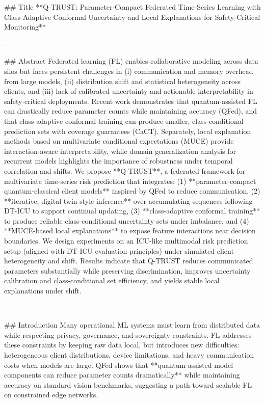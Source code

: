 ## Title
**Q-TRUST: Parameter-Compact Federated Time-Series Learning with Class-Adaptive Conformal Uncertainty and Local Explanations for Safety-Critical Monitoring**

---

## Abstract
Federated learning (FL) enables collaborative modeling across data silos but faces persistent challenges in (i) communication and memory overhead from large models, (ii) distribution shift and statistical heterogeneity across clients, and (iii) lack of calibrated uncertainty and actionable interpretability in safety-critical deployments. Recent work demonstrates that quantum-assisted FL can drastically reduce parameter counts while maintaining accuracy (QFed), and that class-adaptive conformal training can produce smaller, class-conditional prediction sets with coverage guarantees (CaCT). Separately, local explanation methods based on multivariate conditional expectations (MUCE) provide interaction-aware interpretability, while domain generalization analysis for recurrent models highlights the importance of robustness under temporal correlation and shifts.  
We propose **Q-TRUST**, a federated framework for multivariate time-series risk prediction that integrates: (1) **parameter-compact quantum-classical client models** inspired by QFed to reduce communication, (2) **iterative, digital-twin-style inference** over accumulating sequences following DT-ICU to support continual updating, (3) **class-adaptive conformal training** to produce reliable class-conditional uncertainty sets under imbalance, and (4) **MUCE-based local explanations** to expose feature interactions near decision boundaries. We design experiments on an ICU-like multimodal risk prediction setup (aligned with DT-ICU evaluation principles) under simulated client heterogeneity and shift. Results indicate that Q-TRUST reduces communicated parameters substantially while preserving discrimination, improves uncertainty calibration and class-conditional set efficiency, and yields stable local explanations under shift.

---

## Introduction
Many operational ML systems must learn from distributed data while respecting privacy, governance, and sovereignty constraints. FL addresses these constraints by keeping raw data local, but introduces new difficulties: heterogeneous client distributions, device limitations, and heavy communication costs when models are large. QFed shows that **quantum-assisted model components can reduce parameter counts dramatically** while maintaining accuracy on standard vision benchmarks, suggesting a path toward scalable FL on constrained edge networks.

